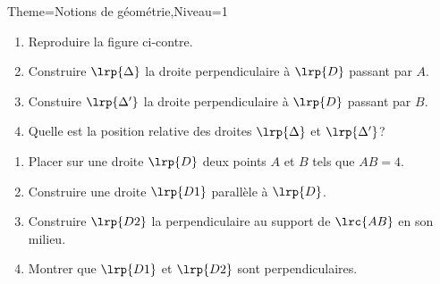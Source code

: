 \documentclass[a4paper,12pt]{article}
\begin{document}
\begin{Maquette}[Fiche]{Theme=Notions de géométrie,Niveau=1}
\begin{exercice}
\begin{minipage}{0.7\linewidth}
\begin{enumerate}
\item Reproduire la figure ci-contre.
\item Construire $\lrp{\Delta}$ la droite perpendiculaire à $\lrp{D}$ passant par $A$.
\item Constuire  $\lrp{\Delta '}$ la droite perpendiculaire à $\lrp{D}$ passant par $B$. 
\item Quelle est la position relative des droites $\lrp{\Delta}$ et $\lrp{\Delta '}$?
\end{enumerate}
\end{minipage}\vline%
\begin{minipage}{0.3\linewidth}
\end{minipage}
\end{exercice}

\begin{exercice}
\begin{enumerate}
\item Placer sur une droite $\lrp{D}$ deux points $A$ et $B$ tels que $AB=4$.
\item Construire une droite $\lrp{D1}$ parallèle à $\lrp{D}$.
\item Construire $\lrp{D2}$ la perpendiculaire au support de $\lrc{AB}$ en son milieu.
\item Montrer que $\lrp{D1}$ et $\lrp{D2}$ sont perpendiculaires.
\end{enumerate}
\end{exercice}


\end{Maquette}
\end{document}
